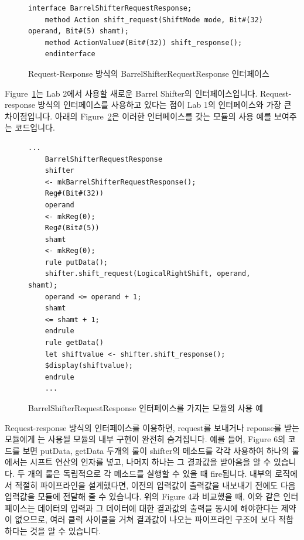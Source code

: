 \documentclass{article}
\begin{document}
\begin{figure}[!ht]
	\centering
\begin{Verbatim}[frame=single]
	interface BarrelShifterRequestResponse;
	method Action shift_request(ShiftMode mode, Bit#(32) operand, Bit#(5) shamt);
	method ActionValue#(Bit#(32)) shift_response();
	endinterface
\end{Verbatim}
	\caption{Request-Response 방식의 BarrelShifterRequestResponse 인터페이스}
	\label{fig:brs_rr_interface}
\end{figure}

Figure~\ref{fig:brs_rr_interface}는 Lab 2에서 사용할 새로운 Barrel Shifter의 인터페이스입니다. 
Request-response 방식의 인터페이스를 사용하고 있다는 점이 Lab 1의 인터페이스와 가장 큰 차이점입니다.
아래의 Figure~\ref{fig:brs_rr_usage}은 이러한 인터페이스를 갖는 모듈의 사용 예를 보여주는 코드입니다.

\begin{figure}[!ht]
	\centering
\begin{Verbatim}[frame=single]
	...
	BarrelShifterRequestResponse
	shifter
	<- mkBarrelShifterRequestResponse();
	Reg#(Bit#(32))
	operand
	<- mkReg(0);
	Reg#(Bit#(5))
	shamt
	<- mkReg(0);
	rule putData();
	shifter.shift_request(LogicalRightShift, operand, shamt);
	operand <= operand + 1;
	shamt
	<= shamt + 1;
	endrule
	rule getData()
	let shiftvalue <- shifter.shift_response();
	$display(shiftvalue);
	endrule
	...
\end{Verbatim}
	\caption{BarrelShifterRequestResponse 인터페이스를 가지는 모듈의 사용 예}
	\label{fig:brs_rr_usage}
\end{figure}

Request-response 방식의 인터페이스를 이용하면, request를 보내거나 reponse를 받는 모듈에게
는 사용될 모듈의 내부 구현이 완전히 숨겨집니다. 예를 들어, Figure 6의 코드를 보면 putData,
getData 두개의 룰이 shifter의 메소드를 각각 사용하여 하나의 룰에서는 시프트 연산의 인자를
넣고, 나머지 하나는 그 결과값을 받아옴을 알 수 있습니다. 두 개의 룰은 독립적으로 각 메소드를
실행할 수 있을 때 fire됩니다. 내부의 로직에서 적절히 파이프라인을 설계했다면, 이전의 입력값이
출력값을 내보내기 전에도 다음 입력값을 모듈에 전달해 줄 수 있습니다. 위의 Figure 4과 비교했을
때, 이와 같은 인터페이스는 데이터의 입력과 그 데이터에 대한 결과값의 출력을 동시에 해야한다는
제약이 없으므로, 여러 클럭 사이클을 거쳐 결과값이 나오는 파이프라인 구조에 보다 적합하다는
것을 알 수 있습니다.
\end{document}
